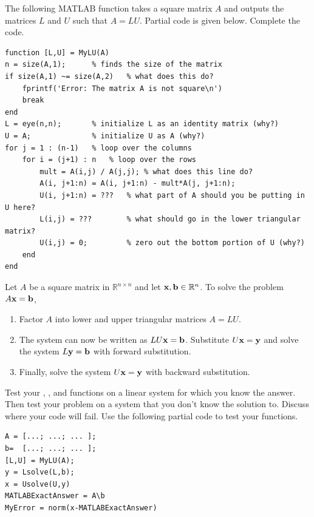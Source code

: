 \begin{technique}[LU Factorization]\label{tech:lu}
    The following MATLAB function takes a square matrix $A$ and
    outputs the matrices $L$ and $U$ such that $A = LU$.  Partial code is given below.
    Complete the code.
\begin{lstlisting}
function [L,U] = MyLU(A)
n = size(A,1);      % finds the size of the matrix
if size(A,1) ~= size(A,2)   % what does this do?
    fprintf('Error: The matrix A is not square\n')
    break
end
L = eye(n,n);       % initialize L as an identity matrix (why?)
U = A;              % initialize U as A (why?)
for j = 1 : (n-1)   % loop over the columns
    for i = (j+1) : n   % loop over the rows
        mult = A(i,j) / A(j,j); % what does this line do?
        A(i, j+1:n) = A(i, j+1:n) - mult*A(j, j+1:n);
        U(i, j+1:n) = ???   % what part of A should you be putting in U here?
        L(i,j) = ???        % what should go in the lower triangular matrix?
        U(i,j) = 0;         % zero out the bottom portion of U (why?)
    end
end
\end{lstlisting}
\end{technique}

\begin{thm}
    Let $A$ be a square matrix in $\mathbb{R}^{n \times n}$ and let ${\bf x}, {\bf b} \in
    \mathbb{R}^n$.  To solve the problem $A {\bf x} ={\bf b}$,
    \begin{enumerate}
        \item Factor $A$ into lower and upper triangular matrices $A = LU$.\\
        \item The system can now be written as $LU {\bf x} = {\bf b}$.  Substitute $U {\bf x} = {\bf
            y}$ and solve the system $L {\bf y} = {\bf b}$ with forward substitution. \\
        \item Finally, solve the system $U {\bf x} = {\bf y}$ with backward substitution. \\
    \end{enumerate}
\end{thm}

\begin{problem}
    Test your , , and  functions on a linear
    system for which you know the answer.  Then test your problem on a system
    that you don't know the solution to.  Discuss where your code will fail. Use the
    following partial code to test your functions.
\begin{lstlisting}
A = [...; ...; ... ];
b=  [...; ...; ... ];
[L,U] = MyLU(A);
y = Lsolve(L,b);
x = Usolve(U,y)
MATLABExactAnswer = A\b
MyError = norm(x-MATLABExactAnswer)
\end{lstlisting}
\end{problem}


